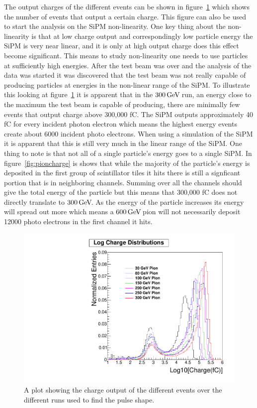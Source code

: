 The output charges of the different events can be shown in figure~\ref{fig:Log} which shows the number of events that output a certain charge. This figure can also be used to start the analysis on the SiPM non-linearity. One key thing about the non-linearity is that at low charge output and correspondingly low particle energy the SiPM is very near linear, and it is only at high output charge does this effect become significant. This means to study non-linearity one needs to use particles at sufficiently high energies. After the test beam was over and the analysis of the data was started it was discovered that the test beam was not really capable of producing particles at energies in the non-linear range of the SiPM. To illustrate this looking at figure~\ref{fig:Log} it is apparent that in the $300 {\,\text{Ge\hspace{-.08em}V\hspace{-0.16em}}}$ run, an energy close to the maximum the test beam is capable of producing, there are minimally few events that output charge above 300,000 fC. The SiPM outputs approximately 40 fC for every incident photon electron which means the highest energy events create about 6000 incident photo electrons. When using a simulation of the SiPM it is apparent that this is still very much in the linear range of the SiPM. One thing to note is that not all of a single particle's energy goes to a single SiPM. In figure~\ref{fig:pioncharge} is shows that while the majority of the particle's energy is deposited in the first group of scintillator tiles it hits there is still a signficant portion that is in neighboring channels. Summing over all the channels should give the total energy of the particle but this means that 300,000 fC does not directly translate to $300 {\,\text{Ge\hspace{-.08em}V\hspace{-0.16em}}}$. As the energy of the particle increases its energy will spread out more which means a $600 {\,\text{Ge\hspace{-.08em}V\hspace{-0.16em}}}$ pion will not necessarily deposit 12000 photo electrons in the first channel it hits.

\begin{figure}
\centering
\includegraphics[width=0.8\linewidth]{Figures/Logplot.pdf}
\caption{A plot showing the charge output of the different events over the different runs used to find the pulse shape.}
\label{fig:Log}
\end{figure}
